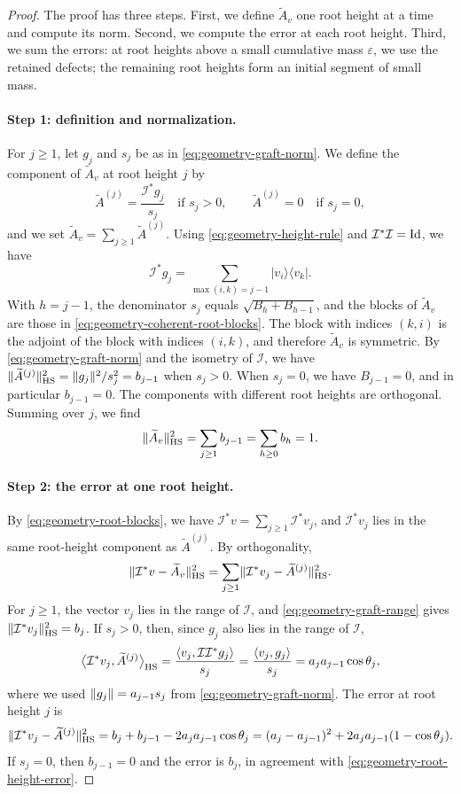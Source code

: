 \begin{proof}
The proof has three steps. First, we define $\widetilde A_v$ one root height at a time and compute its norm. Second, we compute the error at each root height. Third, we sum the errors: at root heights above a small cumulative mass $\varepsilon$, we use the retained defects; the remaining root heights form an initial segment of small mass.

\paragraph{Step 1: definition and normalization.}
For $j\ge1$, let $g_j$ and $s_j$ be as in \eqref{eq:geometry-graft-norm}. We define the component of $\widetilde A_v$ at root height $j$ by
\[
 \widetilde A^{(j)}=\frac{\mathcal I^*g_j}{s_j}\quad\text{if } s_j>0,
 \qquad \widetilde A^{(j)}=0\quad\text{if } s_j=0,
\]
and we set $\widetilde A_v=\sum_{j\ge1}\widetilde A^{(j)}$. Using \eqref{eq:geometry-height-rule} and $\mathcal I^*\mathcal I=\operatorname{Id}$, we have
\[
 \mathcal I^*g_j=\sum_{\max(i,k)=j-1}|v_i\rangle\langle v_k| .
\]
With $h=j-1$, the denominator $s_j$ equals $\sqrt{B_h+B_{h-1}}$, and the blocks of $\widetilde A_v$ are those in \eqref{eq:geometry-coherent-root-blocks}. The block with indices $(k,i)$ is the adjoint of the block with indices $(i,k)$, and therefore $\widetilde A_v$ is symmetric. By \eqref{eq:geometry-graft-norm} and the isometry of $\mathcal I$, we have $\lVert\widetilde A^{(j)}\rVert_{\mathrm{HS}}^2=\lVert g_j\rVert^2/s_j^2=b_{j-1}$ when $s_j>0$. When $s_j=0$, we have $B_{j-1}=0$, and in particular $b_{j-1}=0$. The components with different root heights are orthogonal. Summing over $j$, we find
\[
 \lVert\widetilde A_v\rVert_{\mathrm{HS}}^2=\sum_{j\ge1}b_{j-1}=\sum_{h\ge0}b_h=1 .
\]

\paragraph{Step 2: the error at one root height.}
By \eqref{eq:geometry-root-blocks}, we have $\mathcal I^*v=\sum_{j\ge1}\mathcal I^*v_j$, and $\mathcal I^*v_j$ lies in the same root-height component as $\widetilde A^{(j)}$. By orthogonality,
\[
 \lVert\mathcal I^*v-\widetilde A_v\rVert_{\mathrm{HS}}^2=\sum_{j\ge1}\lVert\mathcal I^*v_j-\widetilde A^{(j)}\rVert_{\mathrm{HS}}^2 .
\]
For $j\ge1$, the vector $v_j$ lies in the range of $\mathcal I$, and \eqref{eq:geometry-graft-range} gives $\lVert\mathcal I^*v_j\rVert_{\mathrm{HS}}^2=b_j$. If $s_j>0$, then, since $g_j$ also lies in the range of $\mathcal I$,
\[
 \bigl\langle\mathcal I^*v_j,\widetilde A^{(j)}\bigr\rangle_{\mathrm{HS}}
 =\frac{\left\langle v_j,\mathcal I\mathcal I^*g_j\right\rangle}{s_j}
 =\frac{\left\langle v_j,g_j\right\rangle}{s_j}
 =a_ja_{j-1}\cos\theta_j,
\]
where we used $\lVert g_j\rVert=a_{j-1}s_j$ from \eqref{eq:geometry-graft-norm}. The error at root height $j$ is
\begin{equation}\label{eq:geometry-root-height-error}
 \lVert\mathcal I^*v_j-\widetilde A^{(j)}\rVert_{\mathrm{HS}}^2
 =b_j+b_{j-1}-2a_ja_{j-1}\cos\theta_j
 =(a_j-a_{j-1})^2+2a_ja_{j-1}(1-\cos\theta_j).
\end{equation}
If $s_j=0$, then $b_{j-1}=0$ and the error is $b_j$, in agreement with \eqref{eq:geometry-root-height-error}.


\end{proof}
